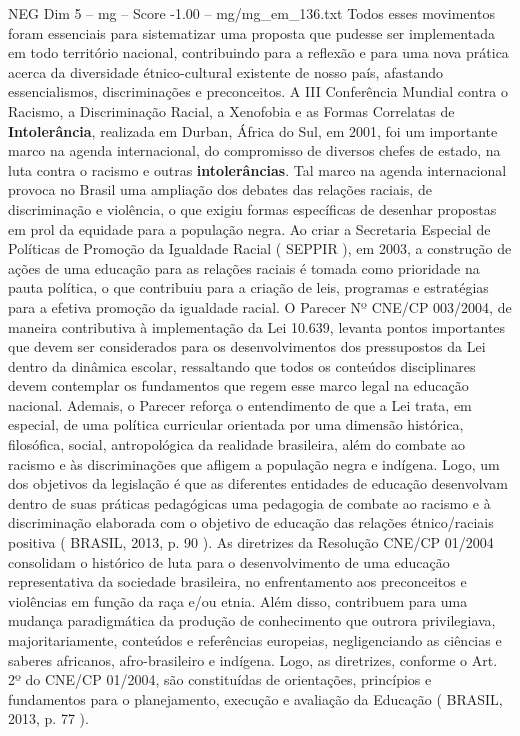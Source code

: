 \begin{textsample}{NEG Dim 5 – mg – Score -1.00 – mg/mg\_em\_136.txt}
Todos esses movimentos foram essenciais para sistematizar uma proposta que pudesse ser implementada em todo território nacional, contribuindo para a reflexão e para uma nova prática acerca da diversidade étnico-cultural existente de nosso país, afastando essencialismos, discriminações e preconceitos.
A III Conferência Mundial contra o Racismo, a Discriminação Racial, a Xenofobia e as Formas Correlatas de \textbf{Intolerância}, realizada em Durban, África do Sul, em 2001, foi um importante marco na agenda internacional, do compromisso de diversos chefes de estado, na luta contra o racismo e outras \textbf{intolerâncias}.
Tal marco na agenda internacional provoca no Brasil uma ampliação dos debates das relações raciais, de discriminação e violência, o que exigiu formas específicas de desenhar propostas em prol da equidade para a população negra.
Ao criar a Secretaria Especial de Políticas de Promoção da Igualdade Racial ( SEPPIR ), em 2003, a construção de ações de uma educação para as relações raciais é tomada como prioridade na pauta política, o que contribuiu para a criação de leis, programas e estratégias para a efetiva promoção da igualdade racial.
O Parecer Nº CNE/CP 003/2004, de maneira contributiva à implementação da Lei 10.639, levanta pontos importantes que devem ser considerados para os desenvolvimentos dos pressupostos da Lei dentro da dinâmica escolar, ressaltando que todos os conteúdos disciplinares devem contemplar os fundamentos que regem esse marco legal na educação nacional.
Ademais, o Parecer reforça o entendimento de que a Lei trata, em especial, de uma política curricular orientada por uma dimensão histórica, filosófica, social, antropológica da realidade brasileira, além do combate ao racismo e às discriminações que afligem a população negra e indígena.
Logo, um dos objetivos da legislação é que as diferentes entidades de educação desenvolvam dentro de suas práticas pedagógicas uma pedagogia de combate ao racismo e à discriminação elaborada com o objetivo de educação das relações étnico/raciais positiva ( BRASIL, 2013, p. 90 ).
As diretrizes da Resolução CNE/CP 01/2004 consolidam o histórico de luta para o desenvolvimento de uma educação representativa da sociedade brasileira, no enfrentamento aos preconceitos e violências em função da raça e/ou etnia.
Além disso, contribuem para uma mudança paradigmática da produção de conhecimento que outrora privilegiava, majoritariamente, conteúdos e referências europeias, negligenciando as ciências e saberes africanos, afro-brasileiro e indígena.
Logo, as diretrizes, conforme o Art. 2º do CNE/CP 01/2004, são constituídas de orientações, princípios e fundamentos para o planejamento, execução e avaliação da Educação ( BRASIL, 2013, p. 77 ).

\end{textsample}
